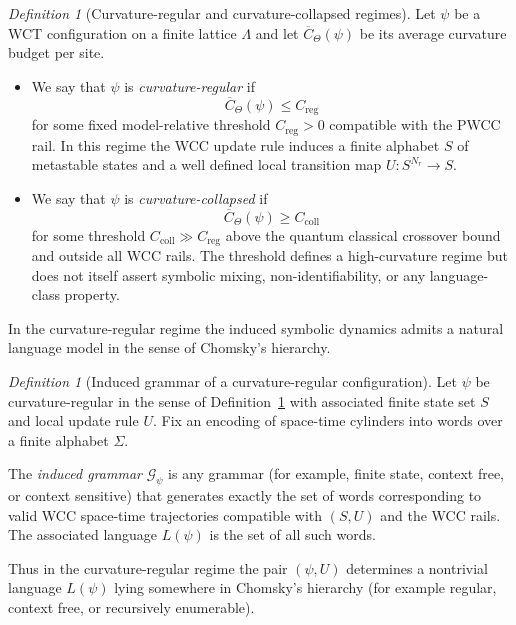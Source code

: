 \documentclass[12pt]{article}
\theoremstyle{remark}
\newtheorem{definition}[theorem]{Definition}
\begin{document}
\begin{definition}[Curvature-regular and curvature-collapsed regimes]
\label{def:curvature-regimes}
Let $\psi$ be a WCT configuration on a finite lattice $\Lambda$ and
let $\overline{C}_\Theta(\psi)$ be its average curvature budget per site.

\begin{itemize}
  \item We say that $\psi$ is \emph{curvature-regular} if
  \[
    \overline{C}_\Theta(\psi) \le C_{\mathrm{reg}}
  \]
  for some fixed model-relative threshold $C_{\mathrm{reg}} > 0$
  compatible with the PWCC rail. In this regime the WCC update rule
  induces a finite alphabet $S$ of metastable states and a well defined
  local transition map $U \colon S^{N_r} \to S$.

  \item We say that $\psi$ is \emph{curvature-collapsed} if
  \[
    \overline{C}_\Theta(\psi) \ge C_{\mathrm{coll}}
  \]
  for some threshold $C_{\mathrm{coll}} \gg C_{\mathrm{reg}}$ above the
  quantum classical crossover bound and outside all WCC rails. The threshold
  defines a high-curvature regime but does not itself assert symbolic
  mixing, non-identifiability, or any language-class property.
\end{itemize}
\end{definition}

In the curvature-regular regime the induced symbolic dynamics admits a
natural language model in the sense of Chomsky's hierarchy.

\begin{definition}[Induced grammar of a curvature-regular configuration]
\label{def:induced-grammar}
Let $\psi$ be curvature-regular in the sense of
Definition~\ref{def:curvature-regimes} with associated finite state set
$S$ and local update rule $U$. Fix an encoding of space-time cylinders
into words over a finite alphabet $\Sigma$.

The \emph{induced grammar} $\mathcal{G}_\psi$ is any grammar (for example,
finite state, context free, or context sensitive) that generates exactly
the set of words corresponding to valid WCC space-time trajectories
compatible with $(S,U)$ and the WCC rails. The associated language
$L(\psi)$ is the set of all such words.
\end{definition}

Thus in the curvature-regular regime the pair $(\psi,U)$ determines a
nontrivial language $L(\psi)$ lying somewhere in Chomsky's hierarchy
(for example regular, context free, or recursively enumerable).
\end{document}
